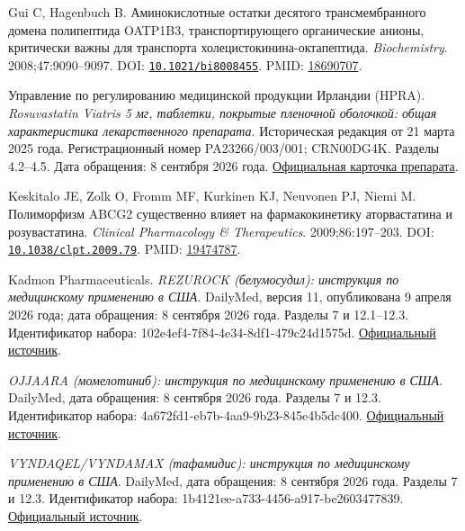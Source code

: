 \documentclass[11pt]{article}
\begin{document}
\begin{description}[before={\microtypesetup{expansion=false}\setlength{\RaggedRightRightskip}{0pt plus 4em}\RaggedRight}]
\item[{[44]}] Gui C, Hagenbuch B. Аминокислотные остатки десятого трансмембранного домена полипептида OATP1B3, транспортирующего органические анионы, критически важны для транспорта холецистокинина-октапептида. \textit{\foreignlanguage{english}{Biochemistry}}. 2008;47:9090--9097. DOI: \href{https://doi.org/10.1021/bi8008455}{\nolinkurl{10.1021/bi8008455}}. PMID: \href{https://pubmed.ncbi.nlm.nih.gov/18690707/}{18690707}.
\item[{[45]}] Управление по регулированию медицинской продукции Ирландии (HPRA). \textit{Rosuvastatin Viatris 5 мг, таблетки, покрытые пленочной оболочкой: общая характеристика лекарственного препарата}. Историческая редакция от 21 марта 2025 года. Регистрационный номер PA23266/003/001; CRN00DG4K. Разделы 4.2--4.5. Дата обращения: 8 сентября 2026 года. \href{https://www.hpra.ie/find-a-medicine/for-human-use/authorised-medicines/details/18914}{Официальная карточка препарата}.
\item[{[46]}] Keskitalo JE, Zolk O, Fromm MF, Kurkinen KJ, Neuvonen PJ, Niemi M. Полиморфизм ABCG2 существенно влияет на фармакокинетику аторвастатина и розувастатина. \textit{\foreignlanguage{english}{Clinical Pharmacology \& Therapeutics}}. 2009;86:197--203. DOI: \href{https://doi.org/10.1038/clpt.2009.79}{\nolinkurl{10.1038/clpt.2009.79}}. PMID: \href{https://pubmed.ncbi.nlm.nih.gov/19474787/}{19474787}.
\item[{[47]}] Kadmon Pharmaceuticals. \textit{REZUROCK (белумосудил): инструкция по медицинскому применению в США}. DailyMed, версия 11, опубликована 9 апреля 2026 года; дата обращения: 8 сентября 2026 года. Разделы 7 и 12.1--12.3. Идентификатор набора: 102e4ef4-7f84-4e34-8df1-479c24d1575d. \href{https://dailymed.nlm.nih.gov/dailymed/drugInfo.cfm?setid=102e4ef4-7f84-4e34-8df1-479c24d1575d}{Официальный источник}.
\item[{[48]}] \textit{OJJAARA (момелотиниб): инструкция по медицинскому применению в США}. DailyMed, дата обращения: 8 сентября 2026 года. Разделы 7 и 12.3. Идентификатор набора: 4a672fd1-eb7b-4aa9-9b23-845e4b5dc400. \href{https://dailymed.nlm.nih.gov/dailymed/drugInfo.cfm?setid=4a672fd1-eb7b-4aa9-9b23-845e4b5dc400}{Официальный источник}.
\item[{[49]}] \textit{VYNDAQEL/VYNDAMAX (тафамидис): инструкция по медицинскому применению в США}. DailyMed, дата обращения: 8 сентября 2026 года. Разделы 7 и 12.3. Идентификатор набора: 1b4121ee-a733-4456-a917-be2603477839. \href{https://dailymed.nlm.nih.gov/dailymed/drugInfo.cfm?setid=1b4121ee-a733-4456-a917-be2603477839}{Официальный источник}.

\end{description}
\end{document}
